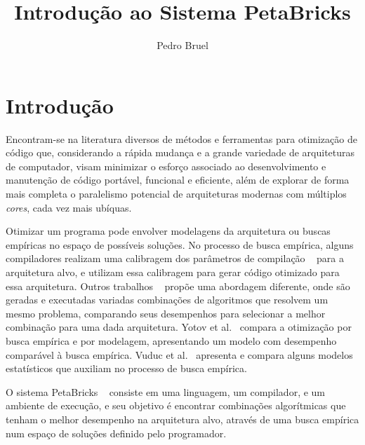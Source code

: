 \documentclass[a4paper, 11pt, twoside]{article}
\begin{document}
\hypersetup{backref,pdfpagemode=FullScreen,colorlinks=true}

\title{Introdução ao Sistema PetaBricks}
\author{Pedro Bruel}
\maketitle

%



\section{Introdução}

Encontram-se na literatura diversos de métodos e ferramentas para otimização de
código que, considerando a rápida mudança e a grande variedade de arquiteturas 
de computador, visam minimizar o esforço associado ao desenvolvimento e 
manutenção de código portável, funcional e eficiente, além de explorar de forma
mais completa o paralelismo potencial de arquiteturas modernas com múltiplos 
\emph{cores}, cada vez mais ubíquas.

Otimizar um programa pode envolver modelagens da arquitetura 
ou buscas empíricas no espaço de possíveis soluções. No processo
de busca empírica, alguns compiladores realizam uma calibragem dos parâmetros 
de compilação ~\cite{whaley1998,yotov2003} para a arquitetura alvo, e utilizam 
essa calibragem para gerar código otimizado para essa arquitetura. Outros 
trabalhos ~\cite{goldman2012framework,mitcsail-tr:2014,vuduc2004} propõe uma 
abordagem diferente, onde são geradas e executadas variadas
combinações de algoritmos que resolvem um mesmo problema, comparando seus 
desempenhos para selecionar a melhor combinação para uma dada arquitetura.
Yotov et al.~\cite{yotov2003} compara a otimização por busca empírica e por 
modelagem, apresentando um modelo com desempenho comparável à busca empírica.
Vuduc et al.~\cite{vuduc2004} apresenta e compara alguns
modelos estatísticos que auxiliam no processo de busca empírica. 

O sistema PetaBricks ~\cite{ansel2009petabricks, ansel2014phd, 
ansel:xrds:2010, mitcsail-tr:2014}
consiste em uma linguagem, um compilador, e um ambiente de execução,
e seu objetivo é encontrar combinações algorítmicas que tenham o melhor 
desempenho na arquitetura alvo, através de uma busca empírica num espaço
de soluções definido pelo programador.
\end{document}
